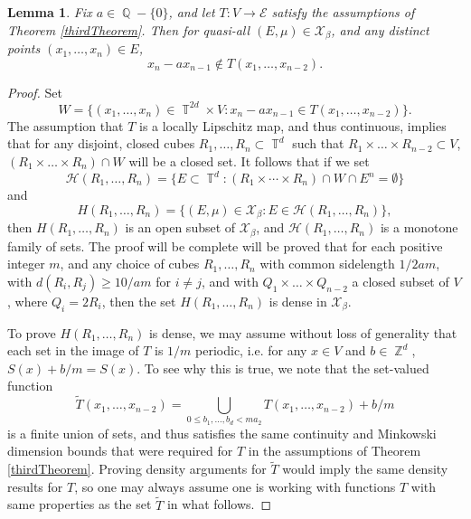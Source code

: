 \documentclass[dvipsnames,letterpaper,12pt]{article}
\numberwithin{equation}{section}
\DeclareMathOperator{\ZZ}{\mathbb{Z}}
\DeclareMathOperator{\QQ}{\mathbb{Q}}
\DeclareMathOperator{\TT}{\mathbb{T}}
\newtheorem{lemma}[theorem]{Lemma}
\numberwithin{theorem}{section}
\begin{document}
\begin{lemma}
    Fix $a \in \QQ - \{ 0 \}$, and let $T: V \to \mathcal{E}$ satisfy the assumptions of Theorem \ref{thirdTheorem}. Then for quasi-all $(E,\mu) \in \mathcal{X}_\beta$, and any distinct points $(x_1,\dots,x_n) \in E$,
    \[ x_n - ax_{n-1} \not \in T(x_1,\dots,x_{n-2}). \]
\end{lemma}
\begin{proof}
    Set
    \[ W = \{ (x_1,\dots,x_n) \in \TT^{2d} \times V : x_n - ax_{n-1} \in T(x_1,\dots,x_{n-2}) \}. \]
    The assumption that $T$ is a locally Lipschitz map, and thus continuous, implies that for any disjoint, closed cubes $R_1,\dots,R_n \subset \TT^d$ such that $R_1 \times \dots \times R_{n-2} \subset V$, $(R_1 \times \dots \times R_n) \cap W$ will be a closed set. It follows that if we set
    \[ \mathcal{H}(R_1,\dots,R_n) = \{ E \subset \TT^d : (R_1 \times \cdots \times R_n) \cap W \cap E^n = \emptyset \} \]
    and
    \[ H(R_1,\dots,R_n) = \{ (E,\mu) \in \mathcal{X}_\beta: E \in \mathcal{H}(R_1,\dots,R_n) \}, \]
    then $H(R_1,\dots,R_n)$ is an open subset of $\mathcal{X}_\beta$, and $\mathcal{H}(R_1,\dots,R_n)$ is a monotone family of sets. The proof will be complete will be proved that for each positive integer $m$, and any choice of cubes $R_1,\dots,R_n$ with common sidelength $1/2am$, with $d(R_i,R_j) \geq 10/am$ for $i \neq j$, and with $Q_1 \times \dots \times Q_{n-2}$ a closed subset of $V$, where $Q_i = 2R_i$, then the set $H(R_1,\dots,R_n)$ is dense in $\mathcal{X}_\beta$.

    To prove $H(R_1,\dots,R_n)$ is dense, we may assume without loss of generality that each set in the image of $T$ is $1/m$ periodic, i.e. for any $x \in V$ and $b \in \ZZ^d$, $S(x) + b/m = S(x)$. To see why this is true, we note that the set-valued function
    \[ \tilde{T}(x_1,\dots,x_{n-2}) = \bigcup_{0 \leq b_1,\dots,b_d < m a_2} T(x_1,\dots,x_{n-2}) + b/m \]
    is a finite union of sets, and thus satisfies the same continuity and Minkowski dimension bounds that were required for $T$ in the assumptions of Theorem \ref{thirdTheorem}. Proving density arguments for $\tilde{T}$ would imply the same density results for $T$, so one may always assume one is working with functions $T$ with same properties as the set $\tilde{T}$ in what follows.



\end{proof}
\end{document}
